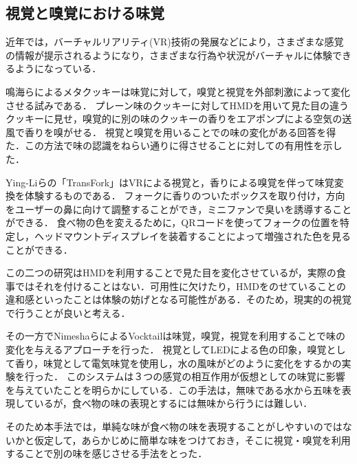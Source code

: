 \subsection{視覚と嗅覚における味覚}
近年では，バーチャルリアリティ(VR)技術の発展などにより，さまざまな感覚の情報が提示されるようになり，さまざまな行為や状況がバーチャルに体験できるようになっている．

鳴海らによるメタクッキー\cite{narumi2}は味覚に対して，嗅覚と視覚を外部刺激によって変化させる試みである．
プレーン味のクッキーに対してHMDを用いて見た目の違うクッキーに見せ，嗅覚的に別の味のクッキーの香りをエアポンプによる空気の送風で香りを嗅がせる．
視覚と嗅覚を用いることでの味の変化がある回答を得た．この方法で味の認識をねらい通りに得させることに対しての有用性を示した．

Ying-Liらの「TransFork」\cite{transfork}はVRによる視覚と，香りによる嗅覚を伴って味覚変換を体験するものである．
フォークに香りのついたボックスを取り付け，方向をユーザーの鼻に向けて調整することができ，ミニファンで臭いを誘導することができる．
食べ物の色を変えるために，QRコードを使ってフォークの位置を特定し，ヘッドマウントディスプレイを装着することによって増強された色を見ることができる．

この二つの研究はHMDを利用することで見た目を変化させているが，実際の食事ではそれを付けることはない．可用性に欠けたり，HMDをのせていることの違和感といったことは体験の妨げとなる可能性がある．そのため，現実的の視覚で行うことが良いと考える．

その一方でNimeshaらによるVocktail\cite{vocktail}は味覚，嗅覚，視覚を利用することで味の変化を与えるアプローチを行った．
視覚としてLEDによる色の印象，嗅覚として香り，味覚として電気味覚を使用し，水の風味がどのように変化をするかの実験を行った．
このシステムは３つの感覚の相互作用が仮想としての味覚に影響を与えていたことを明らかにしている．この手法は，無味である水から五味を表現しているが，食べ物の味の表現とするには無味から行うには難しい．


そのため本手法では，単純な味が食べ物の味を表現することがしやすいのではないかと仮定して，あらかじめに簡単な味をつけておき，そこに視覚・嗅覚を利用することで別の味を感じさせる手法をとった．
